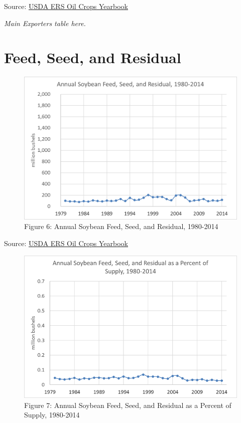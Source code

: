 \documentclass[]{book}
\theoremstyle{definition}
\theoremstyle{definition}
\theoremstyle{remark}
\begin{document}
Source:
\href{http://www.ers.usda.gov/data-products/oil-crops-yearbook.aspx}{USDA
ERS Oil Crops Yearbook}

\emph{Main Exporters table here.}

\section{Feed, Seed, and Residual}\label{feed-seed-and-residual}

\begin{figure}[htbp]
\centering
\includegraphics{Excel-files/ForecastingUseSoy-OilCropsYearbook_files/image003.png}
\caption{Figure 6: Annual Soybean Feed, Seed, and Residual, 1980-2014}
\end{figure}

Source:
\href{http://www.ers.usda.gov/data-products/oil-crops-yearbook.aspx}{USDA
ERS Oil Crops Yearbook}

\begin{figure}[htbp]
\centering
\includegraphics{Excel-files/ForecastingUseSoy-OilCropsYearbook_files/image012.png}
\caption{Figure 7: Annual Soybean Feed, Seed, and Residual as a Percent
of Supply, 1980-2014}
\end{figure}
\end{document}
